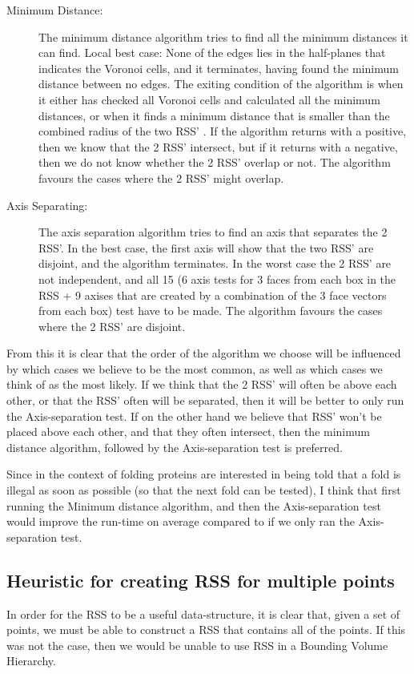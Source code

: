 \begin{description}
\item[Minimum Distance:] The minimum distance algorithm tries to find all the minimum distances it can find. 
Local best case: None of the edges lies in the half-planes that indicates the  Voronoi cells, and it terminates, having found the minimum distance between no edges. The exiting condition of the algorithm is when it either has checked all Voronoi cells  and calculated all the minimum distances, or when it finds a minimum distance that is smaller than the combined radius of the two RSS' . If the algorithm returns with a positive, then we know that the 2 RSS' intersect, but if it returns with a negative, then we do not know whether the 2 RSS' overlap or not. The algorithm favours the cases where the 2 RSS' might overlap.  

\item[Axis Separating:] The axis separation algorithm tries to find an axis that separates the 2 RSS'. In the best case, the first axis will show that the two RSS' are disjoint, and the algorithm terminates. In the worst case the 2 RSS' are not independent, and all 15 (6 axis tests for 3 faces from each box in the RSS  + 9 axises that are created by a combination of the 3 face vectors from each box) test have to be made. The algorithm favours the cases where the 2 RSS' are disjoint.
\end{description}

From this it is clear that the order of the algorithm we choose will be influenced by which cases we believe to be the most common, as well as which cases we think of as the most likely. If we think that the 2 RSS' will often be above each other, or that the RSS' often will be separated, then it will be better to only run the Axis-separation test. If on the other hand we believe that RSS' won't be placed above each other, and that they often intersect, then the minimum distance algorithm, followed by the Axis-separation test is preferred.

Since in the context of folding proteins are interested in being told that a fold is illegal as soon as possible (so that the next fold can be tested), I think that first running the Minimum distance algorithm, and then the Axis-separation test would improve the run-time on average compared to if we only ran the Axis-separation test.

\subsection{Heuristic for creating RSS for multiple points}
In order for the RSS to be a useful data-structure, it is clear that, given a set of points, we must be able to construct a RSS that contains all of the points. If this was not the case, then we would be unable to use RSS in a Bounding Volume Hierarchy.

